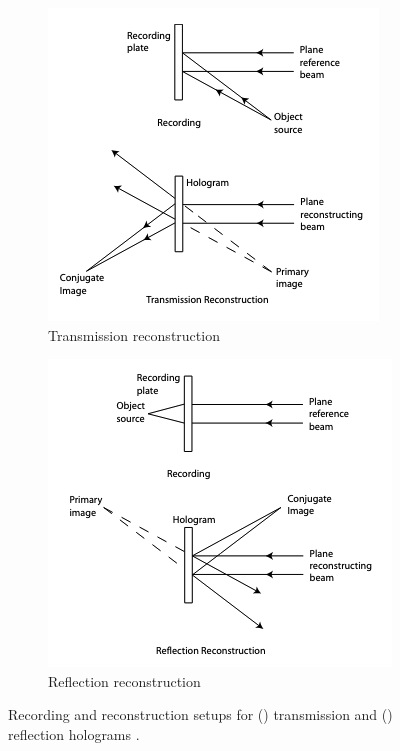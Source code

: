 \documentclass[12pt]{article}
\begin{document}
\begin{figure}[H]
    \centering
    \begin{subfigure}[b]{.45\textwidth}
        \centering
        \includegraphics[width=\linewidth]{transmission reconstruction.png}
        \caption{\centering Transmission reconstruction}
        \label{fig:9a}
    \end{subfigure}
    \hspace{-1em}
    \begin{subfigure}[b]{.45\textwidth}
        \centering
        \includegraphics[width=\linewidth]{reflection reconstruction.png}
        \caption{\centering Reflection reconstruction}
        \label{fig:9b}
    \end{subfigure}
    \caption{\centering Recording and reconstruction setups for () transmission and () reflection holograms \protect\cite{princetonholo}.}
    \label{fig:9}
\end{figure}
\end{document}
